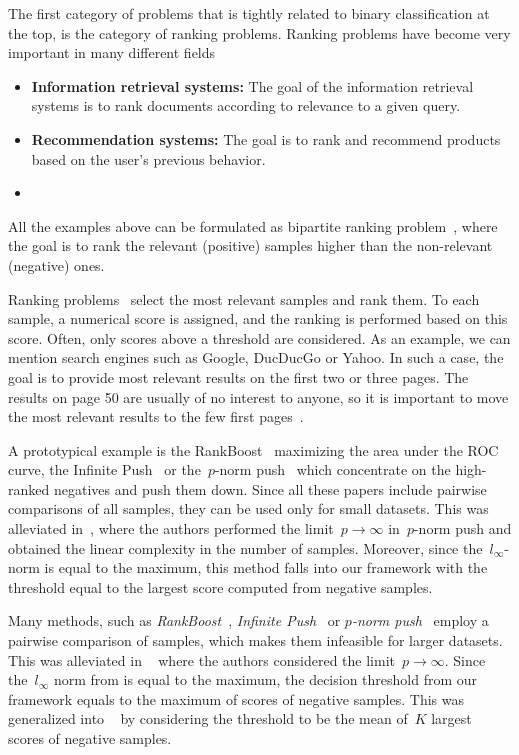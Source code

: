 The first category of problems that is tightly related to binary classification at the top, is the category of ranking problems. Ranking problems have become very important in many different fields
\begin{itemize}
  \item \textbf{Information retrieval systems:} The goal of the information retrieval systems is to rank documents according to relevance to a given query.
  \item \textbf{Recommendation  systems:} The goal is to rank and recommend products based on the user's previous behavior.
  \item 
\end{itemize}
All the examples above can be formulated as bipartite ranking problem~\cite{freund2003efficient, agarwal2005generalization, agarwal2011infinite}, where the goal is to rank the relevant (positive) samples higher than the non-relevant (negative) ones. 



Ranking problems~\cite{freund2003efficient, agarwal2011infinite, rudin2009pnorm, li2014top} select the most relevant samples and rank them. To each sample, a numerical score is assigned, and the ranking is performed based on this score. Often, only scores above a threshold are considered. As an example, we can mention search engines such as Google, DucDucGo or Yahoo. In such a case, the goal is to provide most relevant results on the first two or three pages. The results on page 50 are usually of no interest to anyone, so it is important to move the most relevant results to the few first pages~\cite{cortes2003auc}.







A prototypical example is the RankBoost~\cite{freund2003efficient} maximizing the area under the ROC curve, the Infinite Push~\cite{agarwal2011infinite} or the~$p$-norm push~\cite{rudin2009pnorm} which concentrate on the high-ranked negatives and push them down. Since all these papers include pairwise comparisons of all samples, they can be used only for small datasets. This was alleviated in~\cite{li2014top}, where the authors performed the limit~$p \to \infty$ in~$p$-norm push and obtained the linear complexity in the number of samples. Moreover, since the~$l_{\infty}$-norm is equal to the maximum, this method falls into our framework with the threshold equal to the largest score computed from negative samples.

Many methods, such as \emph{RankBoost}~\cite{freund2003efficient}, \emph{Infinite Push}~\cite{agarwal2011infinite} or \emph{$p$-norm push}~\cite{rudin2009pnorm} employ a pairwise comparison of samples, which makes them infeasible for larger datasets. This was alleviated in \TopPush~\cite{li2014top} where the authors considered the limit~$p \rightarrow \infty$. Since the~$l_{\infty}$ norm from \TopPush is equal to the maximum, the decision threshold from our framework equals to the maximum of scores of negative samples. This was generalized into \TopPushK~\cite{adam2019patmat} by considering the threshold to be the mean of~$K$ largest scores of negative samples.
